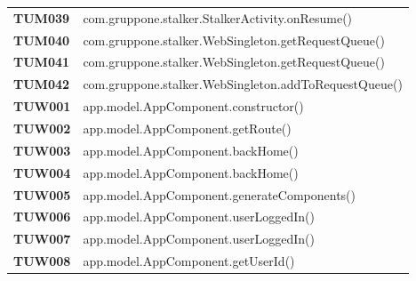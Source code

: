 \documentclass[../../piano-di-qualifica.tex]{subfiles}
\begin{document}
\begin{longtable}[H]{>{\centering\bfseries}m{3cm} >{}m{13cm}}
  TUM039             & com.gruppone.stalker.StalkerActivity.onResume\@()                                                       \\

  TUM040             & com.gruppone.stalker.WebSingleton.getRequestQueue\@()                                                   \\

  TUM041             & com.gruppone.stalker.WebSingleton.getRequestQueue\@()                                                   \\

  TUM042             & com.gruppone.stalker.WebSingleton.addToRequestQueue\@()                                                 \\





  TUW001             & app.model.AppComponent.constructor\@()                                                                  \\

  TUW002             & app.model.AppComponent.getRoute\@()                                                                     \\

  TUW003             & app.model.AppComponent.backHome\@()                                                                     \\

  TUW004             & app.model.AppComponent.backHome\@()                                                                     \\

  TUW005             & app.model.AppComponent.generateComponents\@()                                                           \\

  TUW006             & app.model.AppComponent.userLoggedIn\@()                                                                 \\

  TUW007             & app.model.AppComponent.userLoggedIn\@()                                                                 \\

  TUW008             & app.model.AppComponent.getUserId\@()                                                                    \\


\end{longtable}
\end{document}
